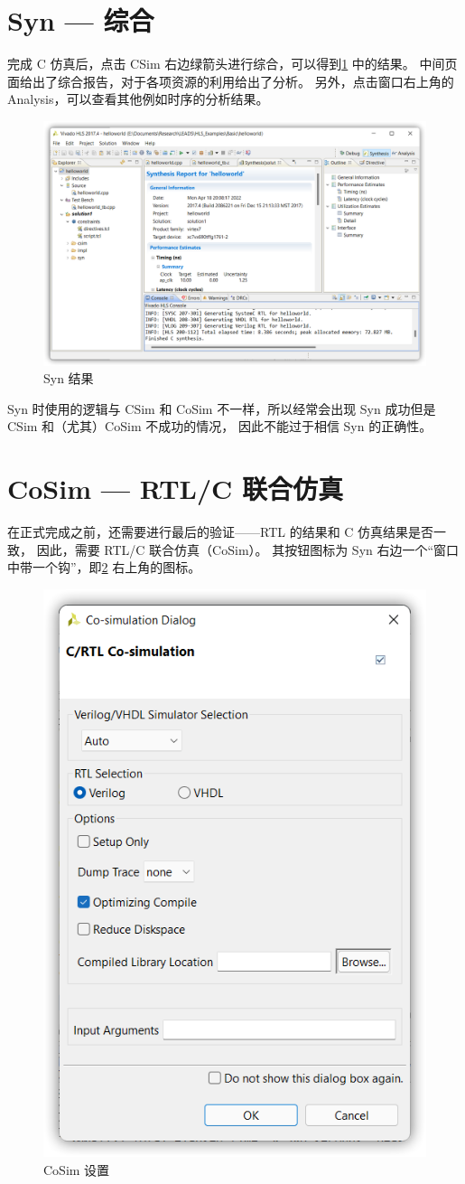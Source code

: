 \documentclass[English,Chinese,French,JP,TC,use boldface,simple name]{beaulivre}
\begin{document}
  \section{Syn --- 综合}

    完成 C 仿真后，点击 CSim 右边绿箭头进行综合，可以得到\cref{fig:syn_result} 中的结果。
    中间页面给出了综合报告，对于各项资源的利用给出了分析。
    另外，点击窗口右上角的 Analysis，可以查看其他例如时序的分析结果。
    \begin{figure}[htbp]
      \centering
      \includegraphics[width=.8\linewidth]{win/helloworld/syn_result.png}
      \caption{Syn 结果}
      \label{fig:syn_result}
    \end{figure}
    \begin{warning}
      Syn 时使用的逻辑与 CSim 和 CoSim 不一样，所以经常会出现 Syn 成功但是 CSim 和（尤其）CoSim 不成功的情况，
      因此不能过于相信 Syn 的正确性。
    \end{warning}

  \section{CoSim --- RTL/C 联合仿真}

    在正式完成之前，还需要进行最后的验证——RTL 的结果和 C 仿真结果是否一致，
    因此，需要 RTL/C 联合仿真（CoSim）。
    其按钮图标为 Syn 右边一个“窗口中带一个钩”，即\cref{fig:C_RTL_cosim} 右上角的图标。
    \begin{figure}[htbp]
      \centering
      \includegraphics[width=.3\linewidth]{win/helloworld/C_RTL_cosim.png}
      \caption{CoSim 设置}
      \label{fig:C_RTL_cosim}
    \end{figure}
\end{document}
